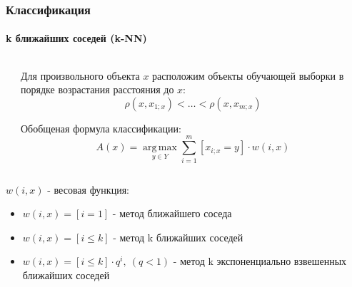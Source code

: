 \documentclass[xcolor=table]{beamer}
\begin{document}
\begin{frame}
  \frametitle{Классификация}
  \framesubtitle{k ближайших соседей (k-NN)}

  \begin{columns}
    \begin{column}{0.4\textwidth}
    \end{column}
    \begin{column}{0.6\textwidth}
      Для произвольного объекта $x$ расположим объекты обучающей выборки в порядке возрастания расстояния до $x$:
      \[\rho(x, x_{1;x}) < \dots < \rho(x, x_{m;x})\]

      Обобщеная формула классификации:
      \vspace{-10pt}
      \[A(x) = \operatorname*{arg\,max}_{y \in Y}{\sum_{i=1}^m[x_{i;x} = y] \cdot w(i, x)}\]
    \end{column}
  \end{columns}  

  $w(i, x)$ - весовая функция:
  \begin{itemize}
  \item $w(i, x) = [i = 1]$ - метод ближайшего соседа
  \item $w(i, x) = [i \leq k]$ - метод k ближайших соседей
  \item $w(i, x) = [i \leq k] \cdot q^i,~(q < 1)$ - метод k экспоненциально взвешенных ближайших соседей
  \end{itemize}
\end{frame}
\end{document}
